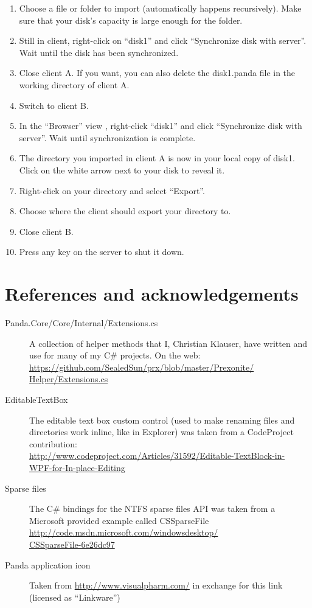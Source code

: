 \documentclass[a4paper,12pt]{article}
\begin{document}
\begin{enumerate}
\item Choose a file or folder to import (automatically happens recursively). Make sure that your disk's capacity is large enough for the folder.
\item Still in client, right-click on ``disk1'' and click ``Synchronize disk with server''. Wait until the disk has been synchronized.
\item Close client A. If you want, you can also delete the disk1.panda file in the working directory of client A.
\item Switch to client B.
\item In the ``Browser'' view , right-click ``disk1'' and click ``Synchronize disk with server''. Wait until synchronization is complete.
\item The directory you imported in client A is now in your local copy of disk1. Click on the white arrow next to your disk to reveal it.
\item Right-click on your directory and select ``Export''.
\item Choose where the client should export your directory to.
\item Close client B.
\item Press any key on the server to shut it down.
\end{enumerate}

\section{References and acknowledgements}
\begin{description}
\item[Panda.Core/Core/Internal/Extensions.cs] A collection of helper methods that I, Christian Klauser, have written and use for many of my C\# projects.
On the web: \\ \href{https://github.com/SealedSun/prx/blob/master/Prexonite/Helper/Extensions.cs}{https://github.com/SealedSun/prx/blob/master/Prexonite/\\{}Helper/Extensions.cs}
\item[EditableTextBox] The editable text box custom control (used to make renaming files and directories work inline, like in Explorer) was taken from a CodeProject contribution: \\ \href{http://www.codeproject.com/Articles/31592/Editable-TextBlock-in-WPF-for-In-place-Editing}{http://www.codeproject.com/Articles/31592/Editable-TextBlock-in-\\{}WPF-for-In-place-Editing}
\item[Sparse files] The C\# bindings for the NTFS sparse files API was taken from a Microsoft provided example called CSSparseFile \\
\href{http://code.msdn.microsoft.com/windowsdesktop/CSSparseFile-6e26dc97}{http://code.msdn.microsoft.com/windowsdesktop/\\{}CSSparseFile-6e26dc97}
\item[Panda application icon] Taken from \href{http://www.visualpharm.com/}{http://www.visualpharm.com/} in exchange for this link (licensed as ``Linkware'')

\end{description}
\end{document}
